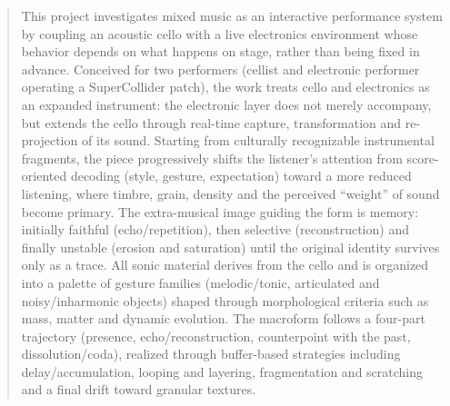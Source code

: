 
\begin{abstract}
This project investigates mixed music as an interactive performance system by coupling an acoustic cello with a live electronics environment whose behavior depends on what happens on stage, rather than being fixed in advance. Conceived for two performers (cellist and electronic performer operating a SuperCollider patch), the work treats cello and electronics as an expanded instrument: the electronic layer does not merely accompany, but extends the cello through real-time capture, transformation and re-projection of its sound. Starting from culturally recognizable instrumental fragments, the piece progressively shifts the listener’s attention from score-oriented decoding (style, gesture, expectation) toward a more reduced listening, where timbre, grain, density and the perceived “weight” of sound become primary. The extra-musical image guiding the form is memory: initially faithful (echo/repetition), then selective (reconstruction) and finally unstable (erosion and saturation) until the original identity survives only as a trace. All sonic material derives from the cello and is organized into a palette of gesture families (melodic/tonic, articulated and noisy/inharmonic objects) shaped through morphological criteria such as mass, matter and dynamic evolution. The macroform follows a four-part trajectory (presence, echo/reconstruction, counterpoint with the past, dissolution/coda), realized through buffer-based strategies including delay/accumulation, looping and layering, fragmentation and scratching and a final drift toward granular textures.
\end{abstract}
